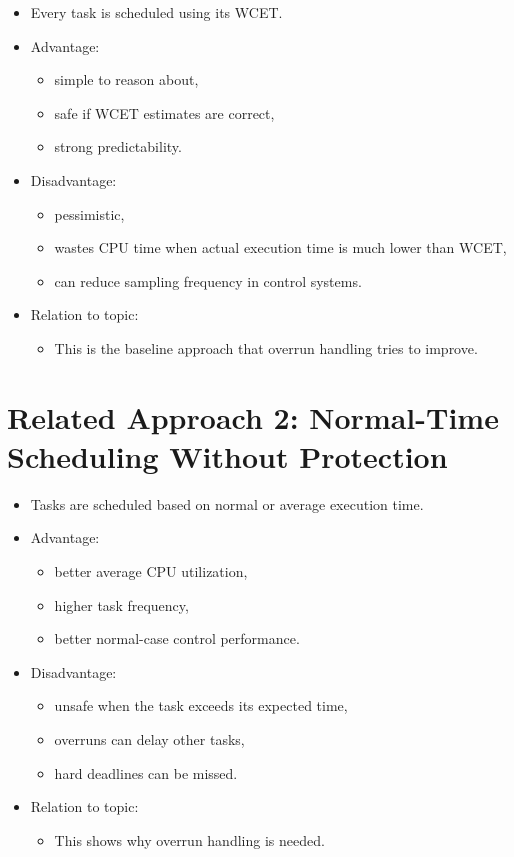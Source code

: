 \documentclass[a4paper,11pt]{article}
\begin{document}
\begin{itemize}
    \item Every task is scheduled using its WCET.
    \item Advantage:
    \begin{itemize}
        \item simple to reason about,
        \item safe if WCET estimates are correct,
        \item strong predictability.
    \end{itemize}
    \item Disadvantage:
    \begin{itemize}
        \item pessimistic,
        \item wastes CPU time when actual execution time is much lower than WCET,
        \item can reduce sampling frequency in control systems.
    \end{itemize}
    \item Relation to topic:
    \begin{itemize}
        \item This is the baseline approach that overrun handling tries to improve.
    \end{itemize}
\end{itemize}

\section*{Related Approach 2: Normal-Time Scheduling Without Protection}

\begin{itemize}
    \item Tasks are scheduled based on normal or average execution time.
    \item Advantage:
    \begin{itemize}
        \item better average CPU utilization,
        \item higher task frequency,
        \item better normal-case control performance.
    \end{itemize}
    \item Disadvantage:
    \begin{itemize}
        \item unsafe when the task exceeds its expected time,
        \item overruns can delay other tasks,
        \item hard deadlines can be missed.
    \end{itemize}
    \item Relation to topic:
    \begin{itemize}
        \item This shows why overrun handling is needed.
    \end{itemize}
\end{itemize}
\end{document}
